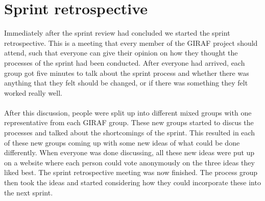 \section{Sprint retrospective}
Immediately after the sprint review had concluded we started the sprint retrospective.
This is a meeting that every member of the GIRAF project should attend, such that everyone can give their opinion on how they thought the processes of the sprint had been conducted.
After everyone had arrived, each group got five minutes to talk about the sprint process and whether there was anything that they felt should be changed, or if there was something they felt worked really well.
\\\\
After this discussion, people were split up into different mixed groups with one representative from each GIRAF group.
These new groups started to discus the processes and talked about the shortcomings of the sprint.
This resulted in each of these new groups coming up with some new ideas of what could be done differently.
When everyone was done discussing, all these new ideas were put up on a website where each person could vote anonymously on the three ideas they liked best.
The sprint retrospective meeting was now finished.
The process group then took the ideas and started considering how they could incorporate these into the next sprint.

